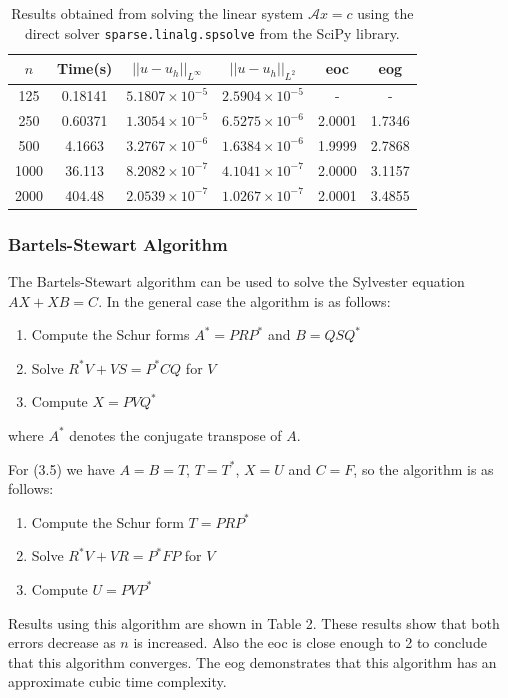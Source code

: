 \documentclass{article}
\numberwithin{equation}{section}
\begin{document}
\begin{table}[H]
\centering
\begin{tabular}{|c|c|c|c|c|c|}
\hline
$n$ & Time(s) & $|| u - u_h ||_{L^{\infty}}$ &$|| u - u_h ||_{L^{2}}$ & eoc & eog \\
\hline
125 & 0.18141 & $5.1807 \times 10^{-5}$ & $2.5904 \times 10^{-5}$ & - & - \\
250 & 0.60371 & $1.3054 \times 10^{-5}$ & $6.5275 \times 10^{-6}$ & 2.0001 & 1.7346 \\
500 & 4.1663 & $3.2767 \times 10^{-6}$ & $1.6384 \times 10^{-6}$ & 1.9999 & 2.7868 \\
1000 & 36.113 & $8.2082 \times 10^{-7}$ & $4.1041 \times 10^{-7}$ & 2.0000 & 3.1157 \\
2000 & 404.48 & $2.0539 \times 10^{-7}$ & $1.0267 \times 10^{-7}$ & 2.0001 & 3.4855 \\
\hline
\end{tabular}
\captionsetup{justification=centering}
\caption{Results obtained from solving the linear system $\mathcal{A} x = c$ using the direct solver  \texttt{sparse.linalg.spsolve} from the SciPy library.}
\end{table}

\subsubsection{Bartels-Stewart Algorithm}
The Bartels-Stewart algorithm \cite{Bartels} can be used to solve the Sylvester equation $AX + XB = C$. In the general case the algorithm is as follows:
\begin{enumerate}
\item Compute the Schur forms $A^* = PRP^*$ and $B=QSQ^*$
\item Solve $R^*V + VS = P^*CQ$ for $V$
\item Compute $X=PVQ^*$
\end{enumerate}
where $A^*$ denotes the conjugate transpose of $A$.

For (3.5) we have $A=B=T$, $T=T^*$, $X=U$ and $C=F$, so the algorithm is as follows:
\begin{enumerate}
\item Compute the Schur form $T=PRP^*$
\item Solve $R^*V + VR = P^*FP$ for $V$
\item Compute $U=PVP^*$
\end{enumerate}

Results using this algorithm are shown in Table 2. These results show that both errors decrease as $n$ is increased. Also the eoc is close enough to 2 to conclude that this algorithm converges. The eog demonstrates that this algorithm has an approximate cubic time complexity. 
\end{document}
